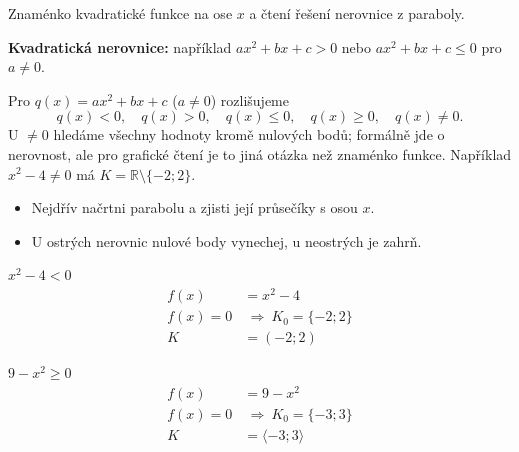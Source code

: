 \documentclass[11pt,a4paper]{article}
\begin{document}
Znaménko kvadratické funkce na ose $x$ a čtení řešení nerovnice z paraboly.
\begin{definiceBox}[title={Definice - Kvadratická nerovnice}]
\textbf{Kvadratická nerovnice:} například $ax^2+bx+c>0$ nebo $ax^2+bx+c\le0$ pro $a\ne0$.
\end{definiceBox}
Pro $q(x)=ax^2+bx+c$ ($a\ne0$) rozlišujeme
\[q(x)<0,\quad q(x)>0,\quad q(x)\le0,\quad q(x)\ge0,\quad q(x)\ne0.\]
U $\ne0$ hledáme všechny hodnoty kromě nulových bodů; formálně jde o nerovnost,
ale pro grafické čtení je to jiná otázka než znaménko funkce.
Například $x^2-4\ne0$ má $K=\mathbb R\setminus\{-2;2\}$.
\begin{itemize}
\item Nejdřív načrtni parabolu a zjisti její průsečíky s osou $x$.
\item U ostrých nerovnic nulové body vynechej, u neostrých je zahrň.
\end{itemize}
\begin{center}
\end{center}
\begin{prikladReseniBox}[title={Příklad 1}]
$x^{2} - 4<0$
\tcblower
\[
\begin{aligned}
f(x)&=x^{2} - 4\\[2pt]
f(x)=0&\ \Rightarrow\ K_0=\{-2;2\}\\[2pt]
K&=(-2;2)
\end{aligned}
\]
\end{prikladReseniBox}
\begin{prikladReseniBox}[title={Příklad 2}]
$9 - x^{2}\ge0$
\tcblower
\[
\begin{aligned}
f(x)&=9 - x^{2}\\[2pt]
f(x)=0&\ \Rightarrow\ K_0=\{-3;3\}\\[2pt]
K&=\langle-3;3\rangle
\end{aligned}
\]
\end{prikladReseniBox}
\end{document}
